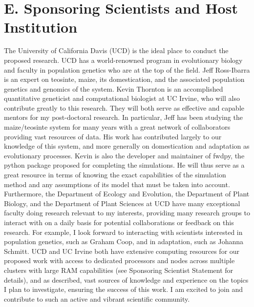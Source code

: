 \section*{E. Sponsoring Scientists and Host Institution}\vspace{-1ex}

The University of California Davis (UCD) is the ideal place to conduct the proposed research. UCD has a world-renowned program in evolutionary biology and faculty in population genetics who are at the top of the field. Jeff Ross\--Ibarra is an expert on teosinte, maize, its domestication, and the associated population genetics and genomics of the system. Kevin Thornton is an accomplished quantitative geneticist and computational biologist at UC Irvine, who will also contribute greatly to this research. They will both serve as effective and capable mentors for my post-doctoral research. In particular, Jeff has been studying the maize\//teosinte system for many years with a great network of collaborators providing vast resources of data. His work has contributed largely to our knowledge of this system, and more generally on domestication and adaptation as evolutionary processes. Kevin is also the developer and maintainer of fwdpy, the python package proposed for completing the simulations. He will thus serve as a great resource in terms of knowing the exact capabilities of the simulation method and any assumptions of its model that must be taken into account.
Furthermore, the Department of Ecology and Evolution, the Department of Plant Biology, and the Department of Plant Sciences at UCD have many exceptional faculty doing research relevant to my interests, providing many research groups to interact with on a daily basis for potential collaborations or feedback on this research. For example, I look forward to interacting with scientists interested in population genetics, such as Graham Coop, and in adaptation, such as Johanna Schmitt. %
UCD and UC Irvine both have extensive computing resources for our proposed work with access to dedicated processors and nodes across multiple clusters with large RAM capabilities (see Sponsoring Scientist Statement for details), and as described, vast sources of knowledge and experience on the topics I plan to investigate, ensuring the success of this work. I am excited to join and contribute to such an active and vibrant scientific community.\vspace{-1ex}

